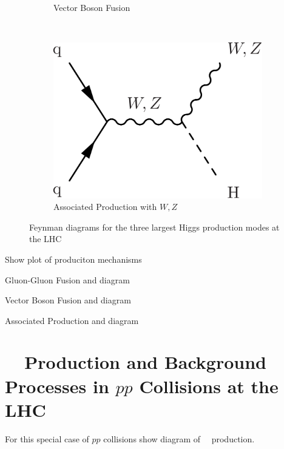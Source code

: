 \begin{figure}
\begin{subfigure}[b]{0.3\textwidth}
        \caption{Vector Boson Fusion}
      \end{subfigure}
      ~ %
      \begin{subfigure}[b]{0.3\textwidth}
        \label{fig:higgs_production_ggf}
        \includegraphics[width=\textwidth]{Figures/Feynman_Diagrams/higgs_production__vh.pdf}
        \caption{Associated Production with $W,Z$}
      \end{subfigure}
      \caption{Feynman diagrams for the three largest Higgs production
        modes at the LHC} \label{fig:feynman_diagrams__higgs_production}
\end{figure}

\par Show plot of produciton mechanisms

\par Gluon-Gluon Fusion and diagram

\par Vector Boson Fusion and diagram

\par Associated Production and diagram


\section{~\ttH~Production and Background Processes in $pp$ Collisions
  at the LHC}
\label{ttH_production_and_backgrounds_overview}

\par For this special case of $pp$ collisions show diagram of
~\ttH~production.

